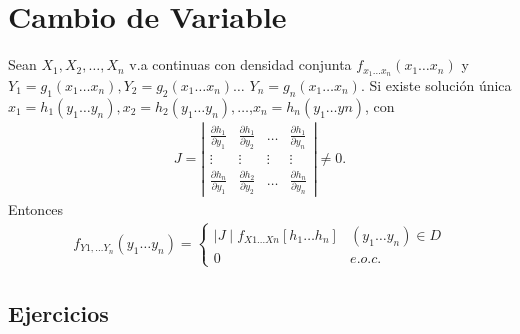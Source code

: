 \section{Cambio de Variable}

\begin{Teo}
Sean $X_{1}, X_{2},\ldots,X _{n}$ v.a continuas con densidad conjunta $f_{x_{1}\ldots x_{n}}\left( x_{1} \ldots x_{n}\right)$ y $Y_{1}=g_{1} \left(x_{1}\ldots x_{n}\right),Y_{2}=g_{2} \left(x_{1}\ldots x_{n}  \right)\ldots $ $Y_{n}= g_{n} \left(x_{1}\ldots x_{n}\right)$. Si existe solución única $x_{1}=h_{1}\left(y_{1}\ldots y_{n}\right),x_{2}=h_{2}\left(y_{1}\ldots y_{n}\right),\ldots$,$x_{n}=h_{n} \left(y_{1}\ldots y{n}\right)$, con 
\begin{eqnarray*}
J= \left| 
\begin{array}{cccc}
\frac{\partial h_{1}}{\partial y_{1}} & \frac{\partial h_{1}}{\partial y_{2}} & \ldots & \frac{\partial h_{1}}{\partial y_{n}}\\
\vdots & \vdots & \vdots & \vdots \\
\frac{\partial h_{n}}{\partial y_{1}} & \frac{\partial h_{2}}{\partial y_{2}} & \ldots & \frac{\partial h_{n}}{\partial y_{n}}
\end{array}
\right|
\neq 0.
\end{eqnarray*}
 Entonces
\begin{eqnarray*}
f_{Y1, \ldots Y_{n}}\left( y_{1} \ldots y_{n} \right)=\begin{cases}
\mid J \mid f_{X1 \ldots Xn}\left[h_{1} \ldots h_{n}\right] & \left(y_{1} \ldots y_{n} \right) \in D \\  
0 & e.o.c.
\end{cases}
\end{eqnarray*}
\end{Teo}
\subsection{Ejercicios}

